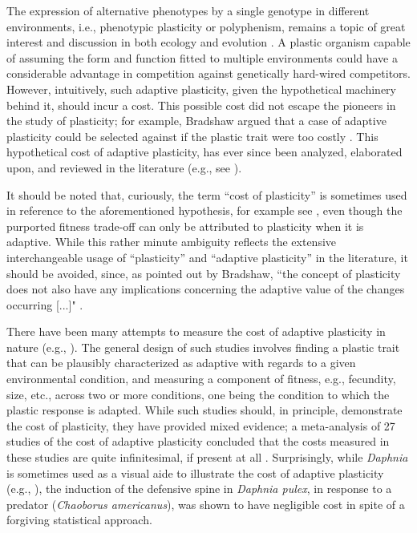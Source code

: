 \documentclass[10pt,letterpaper]{article}
\begin{document}
The expression of alternative phenotypes by a single genotype in different environments, i.e., phenotypic plasticity or polyphenism, remains a topic of great interest and discussion in both ecology and evolution \cite{Schmalhausen1949, Waddington1957, Eberhard2003, Sommer2020a}. A plastic organism capable of assuming the form and function fitted to multiple environments could have a considerable advantage in competition against genetically hard-wired competitors. However, intuitively, such adaptive plasticity, given the hypothetical machinery behind it, should  incur a cost. This possible cost did not escape the pioneers in the study of plasticity; for example, Bradshaw argued that a case of adaptive plasticity could be selected against if the plastic trait were too costly \cite{Bradshaw1965}. This hypothetical cost of adaptive plasticity, has ever since been analyzed, elaborated upon, and reviewed in the literature (e.g., see \cite{Newman1992, DeWitt1998, Murren2015, Forsman2015, Agrawal2020}). 

\hspace{5cm}

It should be noted that, curiously, the term ``cost of plasticity'' is sometimes used in reference to the aforementioned hypothesis, for example see \cite{Callahan2008, Agrawal2020}, even though the purported fitness trade-off can only be attributed to plasticity when it is adaptive. While this rather minute ambiguity reflects the extensive interchangeable usage of ``plasticity'' and ``adaptive plasticity'' in the literature, it should be avoided, since, as pointed out by Bradshaw, ``the concept of plasticity does not also have any implications concerning the adaptive value of the changes occurring [...]" \cite{Bradshaw1965}.  

\hspace{5cm}

There have been many attempts to measure the cost of adaptive plasticity in nature (e.g., \cite{Krebs1997, Smekens2001, STEINER2008}). The general design of such studies involves finding a plastic trait that can be plausibly characterized as adaptive with regards to a given environmental condition, and measuring a component of fitness, e.g., fecundity, size, etc., across two or more conditions, one being the condition to which the plastic response is adapted. While such studies should, in principle, demonstrate the cost of plasticity, they have provided mixed evidence; a meta-analysis of 27 studies of the cost of adaptive plasticity concluded that the costs measured in these studies are quite infinitesimal, if present at all \cite{BUSKIRK2009}. Surprisingly, while \emph{Daphnia} is sometimes used as a visual aide to illustrate the cost of adaptive plasticity (e.g., \cite{Pfennig2021}), the induction of the defensive spine in \emph{Daphnia pulex}, in response to a predator (\emph{Chaoborus americanus}), was shown to have negligible cost in spite of a forgiving statistical approach\cite{Scheiner1998}. 
\end{document}
